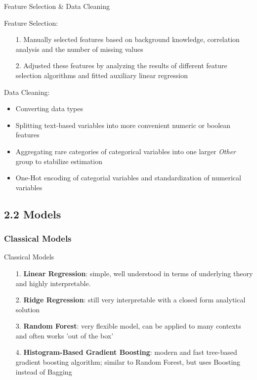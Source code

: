 \documentclass[ngerman,inputenc]{beamer}
\begin{document}
\begin{frame}{Feature Selection \& Data Cleaning}

  Feature Selection:
  \begin{itemize}
    \item[1.] Manually selected features based on background knowledge, correlation analysis and the number of missing values
    \item[2.] Adjusted these features by analyzing the results of different feature selection algorithms and fitted auxiliary linear regression 
  \end{itemize}

  \pause

  \hspace{5pt}

  Data Cleaning:
  \begin{itemize}
    \item Converting data types
    \item Splitting text-based variables into more convenient numeric or boolean features
    \item Aggregating rare categories of categorical variables into one larger \emph{Other} group to stabilize estimation
    \item One-Hot encoding of categorial variables and standardization of numerical variables
  \end{itemize}

\end{frame}



\subsection{2.2 Models}

\subsubsection{Classical Models}

\begin{frame}{Classical Models}
  \begin{itemize}
    \item[1.] \textbf{Linear Regression}: simple, well understood in terms of underlying theory and highly interpretable.
    \item[2.] \textbf{Ridge Regression}: still very interpretable with a closed form analytical solution
    \item[3.] \textbf{Random Forest}: very flexible model, can be applied to many contexts and often works 'out of the box'
    \item[4.] \textbf{Histogram-Based Gradient Boosting}: modern and fast tree-based gradient boosting algorithm; similar to Random Forest, but uses Boosting instead of Bagging
  \end{itemize}

\end{frame}
\end{document}

